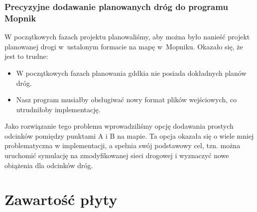 \subsection{Precyzyjne dodawanie planowanych dróg do programu Mopnik}
W początkowych fazach projektu planowaliśmy, aby można było nanieść projekt planowanej drogi w~ustalonym formacie na mapę w~Mopniku. Okazało się, że jest to trudne:
\begin{itemize}
\item W początkowych fazach planowania \acrshort{gddkia} nie posiada dokładnych planów dróg.
\item Nasz program musiałby obsługiwać nowy format plików wejściowych, co utrudniłoby implementację.
\end{itemize}
Jako rozwiązanie tego problemu wprowadziliśmy opcję dodawania prostych odcinków pomiędzy punktami A i B na mapie. Ta opcja okazała się o wiele mniej problematyczna w implementacji, a spełnia swój podstawowy cel, tzn. można uruchomić symulację na zmodyfikowanej sieci drogowej i wyznaczyć nowe obiążenia dla odcinków dróg.

\chapter{Zawartość płyty}

